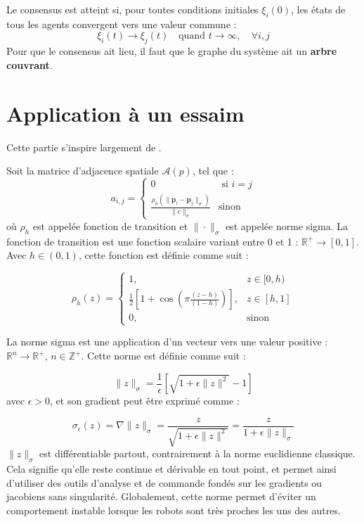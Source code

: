 Le consensus est atteint si, pour toutes conditions initiales $\xi_i(0)$, les états de tous les agents convergent vers une valeur commune :
$$\xi_i(t) \to \xi_j(t) \quad \text{quand } t \to \infty, \quad \forall i,j$$
Pour que le consensus ait lieu, il faut que le graphe du système ait un \textbf{arbre couvrant}.

\section{Application à un essaim}

\noindent Cette partie s'inspire largement de \cite{koung_cooperative_2022,olfati-saber_flocking_2006,saif_distributed_2019}.

\noindent Soit la matrice d'adjacence spatiale $\mathcal{A}(p)$, tel que : 
\begin{equation}
    a_{i,j} =
    \begin{cases}
    0 & \text{ si } i=j  
     \\
    \frac{\rho_h(\|\mathbf{p}_i - \mathbf{p}_j\|_\sigma)}{\|c\|_\sigma} & \text{sinon}
    \end{cases}
\end{equation}
où $\rho_h$ est appelée fonction de transition et $\|\cdot\|_\sigma$ est appelée norme sigma. La fonction de transition est une fonction scalaire variant entre 0 et 1 : $\mathbb{R}^+ \to [0, 1]$. Avec $h \in (0, 1)$, cette fonction est définie comme suit :

\begin{equation}
\rho_h(z) = \begin{cases}
1, & z \in [0, h) \\
\frac{1}{2}\left[1 + \cos\left(\pi \frac{(z - h)}{(1 - h)}\right)\right], & z \in [h, 1] \\
0, & \text{sinon}
\end{cases} \tag{2.14}
\end{equation}

La norme sigma est une application d'un vecteur vers une valeur positive : $\mathbb{R}^n \to \mathbb{R}^+$, $n \in \mathbb{Z}^+$. Cette norme est définie comme suit :

\begin{equation}
\|z\|_\sigma = \frac{1}{\epsilon}\left[\sqrt{1 + \epsilon\|z\|^2} - 1\right] \tag{2.15}
\end{equation}
avec $\epsilon > 0$, et son gradient peut être exprimé comme :

\begin{equation}
\sigma_\epsilon(z) = \nabla\|z\|_\sigma = \frac{z}{\sqrt{1 + \epsilon\|z\|^2}} = \frac{z}{1 + \epsilon\|z\|_\sigma} \tag{2.16}
\end{equation}
$\|z\|_\sigma$ est différentiable partout, contrairement à la norme euclidienne classique. Cela signifie qu'elle reste continue et dérivable en tout point, et permet ainsi d'utiliser des outils d'analyse et de commande fondés sur les gradients ou jacobiens sans singularité. Globalement, cette norme permet d'éviter un comportement instable lorsque les robots sont très proches les uns des autres.

